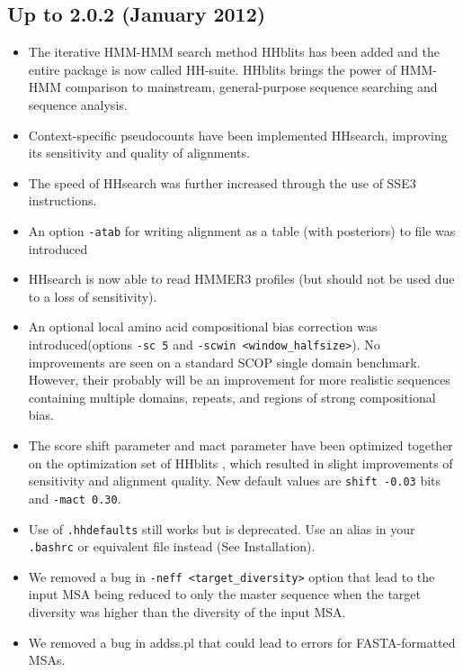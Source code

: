 \documentclass[11pt,a4paper]{article}
\begin{document}
\subsection{Up to 2.0.2 (January 2012)}
\begin{itemize}

\item The iterative HMM-HMM search method HHblits has been added and the entire package is now called HH-suite. HHblits brings the power of HMM-HMM comparison to mainstream, general-purpose sequence searching and sequence analysis. 

\item Context-specific pseudocounts have been implemented HHsearch, improving its sensitivity and quality of alignments.

\item The speed of HHsearch was further increased through the use of SSE3 instructions.

\item An option \verb`-atab` for writing alignment as a table (with posteriors) to file was introduced

\item HHsearch is now able to read HMMER3 profiles (but should not be used due to a loss of sensitivity).

\item An optional local amino acid compositional bias correction was introduced(options \verb`-sc 5` and \verb`-scwin <window_halfsize>`). No improvements are seen on a standard SCOP single domain benchmark. However, their probably will be an improvement for more realistic sequences containing multiple domains, repeats, and regions of strong compositional bias. 

\item The score shift parameter and mact parameter have been optimized together on the optimization set of HHblits \cite{Remmert:2011}, which resulted in slight improvements of sensitivity and alignment quality. New default values are  \verb`shift -0.03` bits and \verb`-mact 0.30`. 

\item Use of \verb`.hhdefaults` still works but is deprecated. Use an alias in 
your \verb`.bashrc` or equivalent file instead (See Installation).

\item We removed a bug in \verb`-neff <target_diversity>` option that lead to the input MSA being reduced to only the master sequence when the target diversity was higher than the diversity of the input MSA.

\item We removed a bug in addss.pl that could lead to errors for FASTA-formatted MSAs.

\end{itemize}
\end{document}
